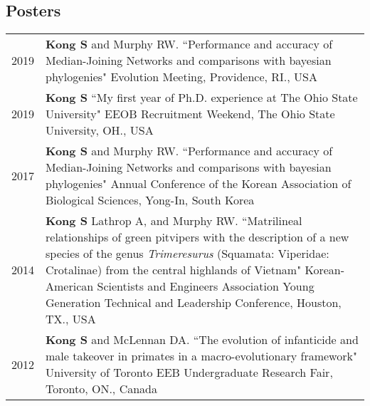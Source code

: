 \documentclass[11pt]{article}
\begin{document}
\subsection*{Posters}
\begin{longtable}{p{}  p{}}
2019 & \textbf{Kong S} and Murphy RW. ``Performance and accuracy of Median-Joining Networks and comparisons with bayesian phylogenies" Evolution Meeting, Providence, RI., USA \vspace{10pt} \\ 
2019 &  \textbf{Kong S} ``My first year of Ph.D. experience at The Ohio State University" EEOB Recruitment Weekend,  The Ohio State University, OH., USA\vspace{10pt} \\ 
2017 & \textbf{Kong S} and Murphy RW. ``Performance and accuracy of Median-Joining Networks and comparisons with bayesian phylogenies"  Annual Conference of the Korean Association of Biological Sciences, Yong-In, South Korea\vspace{10pt} \\ 
2014 & \textbf{Kong S} Lathrop A, and Murphy RW. ``Matrilineal relationships of green pitvipers with the description of a new species of the genus \textit{Trimeresurus} (Squamata: Viperidae: Crotalinae) from the central highlands of Vietnam" Korean-American Scientists and Engineers Association Young Generation Technical and Leadership Conference, Houston, TX., USA\vspace{10pt} \\ 
2012 & \textbf{Kong S} and McLennan DA. ``The evolution of infanticide and male takeover in primates in a macro-evolutionary framework" University of Toronto EEB Undergraduate Research Fair, Toronto, ON., Canada\vspace{10pt}\\
\end{longtable}
\end{document}
